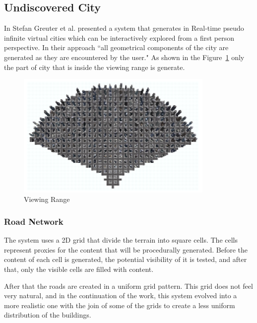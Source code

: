 
\subsection{Undiscovered City} %
\label{sub:undiscovered_city}

In \cite{Greuter2003} Stefan Greuter et al. presented a system that generates in Real-time pseudo infinite virtual cities which can be interactively explored from a first person perspective. In their approach ``all geometrical components of the city are generated as they are encountered by the user." As shown in the Figure~\ref{fig:viewingRange} only the part of city that is inside the viewing range is generate.

\begin{figure}[htbp]
	\centering
	\includegraphics[width=0.85\textwidth]{img/Real-Time-procedural-generation/viewing-range.png}
	\caption{Viewing Range}
	\label{fig:viewingRange}
\end{figure}

\subsubsection{Road Network} %
\label{ssub:road_network}

The system uses a 2D grid that divide the terrain into square cells. The cells represent proxies for the content that will be procedurally generated. Before the content of each cell is generated, the potential visibility of it is tested, and after that, only the visible cells are filled with content.

After that the roads are created in a uniform grid pattern. This grid does not feel very natural, and in the continuation of the work, this system evolved into a more realistic one with the join of some of the grids to create a less uniform distribution of the buildings.

